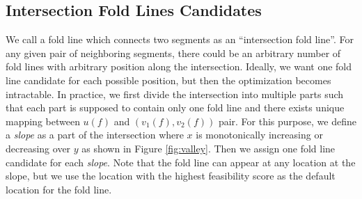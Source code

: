 \subsection{Intersection Fold Lines Candidates} \label{intersection_fold_line_candidates}
We call a fold line which connects two segments as an ``intersection fold line''. For any given pair of neighboring segments, there could be an arbitrary number of fold lines with arbitrary position along the intersection. Ideally, we want one fold line candidate for each possible position, but then the optimization becomes intractable. In practice, we first divide the intersection into multiple parts such that each part is supposed to contain only one fold line and there exists unique mapping between $u(f)$ and $(v_1(f), v_2(f))$ pair. For this purpose, we define a \textit{slope} as a part of the intersection where $x$ is monotonically increasing or decreasing over $y$ as shown in Figure \ref{fig:valley}. Then we assign one fold line candidate for each \textit{slope}. Note that the fold line can appear at any location at the slope, but we use the location with the highest feasibility score as the default location for the fold line.

